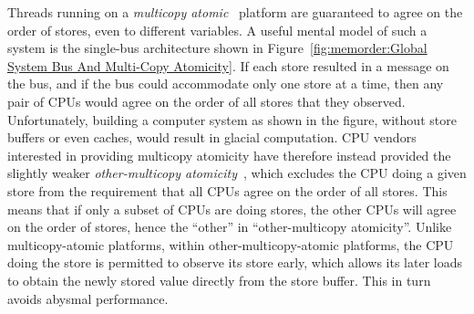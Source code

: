 Threads running on a \emph{multicopy atomic}~\cite{Stone:1995:SP:623262.623912}
platform are guaranteed
to agree on the order of stores, even to different variables.
A useful mental model of such a system is the single-bus architecture
shown in
Figure~\ref{fig:memorder:Global System Bus And Multi-Copy Atomicity}.
If each store resulted in a message on the bus, and if the bus could
accommodate only one store at a time, then any pair of CPUs would
agree on the order of all stores that they observed.
Unfortunately, building a computer system as shown in the figure,
without store buffers or even caches, would result in glacial computation.
CPU vendors interested in providing multicopy atomicity have therefore
instead provided the slightly weaker
\emph{other-multicopy atomicity}~\cite[Section B2.3]{ARMv8A:2017},
which excludes the CPU doing a given store from the requirement that all
CPUs agree on the order of all stores.
This means that if only a subset of CPUs are doing stores, the
other CPUs will agree on the order of stores, hence the ``other''
in ``other-multicopy atomicity''.
Unlike multicopy-atomic platforms, within other-multicopy-atomic platforms,
the CPU doing the store is permitted to observe its
store early, which allows its later loads to obtain the newly stored
value directly from the store buffer.
This in turn avoids abysmal performance.

